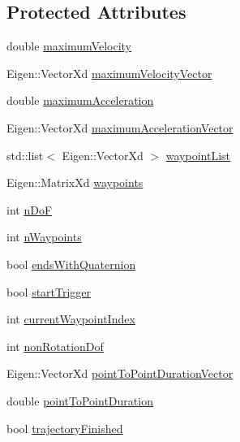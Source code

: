 \subsection*{Protected Attributes}
\begin{DoxyCompactItemize}
\item 
double \hyperlink{classocra_1_1Trajectory_ad79f3742bec59a80c3d641ccdc08012d}{maximum\+Velocity}
\item 
Eigen\+::\+Vector\+Xd \hyperlink{classocra_1_1Trajectory_a206795c8d7e3bcb38b893d69fe0fa336}{maximum\+Velocity\+Vector}
\item 
double \hyperlink{classocra_1_1Trajectory_a9dbb0a7d6ecaeaf98b915193a8c853d7}{maximum\+Acceleration}
\item 
Eigen\+::\+Vector\+Xd \hyperlink{classocra_1_1Trajectory_a86d9d30e890716e117ab2d3b4b328f3d}{maximum\+Acceleration\+Vector}
\item 
std\+::list$<$ Eigen\+::\+Vector\+Xd $>$ \hyperlink{classocra_1_1Trajectory_a37630b26ba23826298167f37534ff6f3}{waypoint\+List}
\item 
Eigen\+::\+Matrix\+Xd \hyperlink{classocra_1_1Trajectory_ab0514f8c3c8d4827b19dc863ff800b43}{waypoints}
\item 
int \hyperlink{classocra_1_1Trajectory_a6c5df48ec92b0a64dc39091bc0c17199}{n\+DoF}
\item 
int \hyperlink{classocra_1_1Trajectory_a233933b988029ac1a6ae24b58e59bf3e}{n\+Waypoints}
\item 
bool \hyperlink{classocra_1_1Trajectory_a4f230978860de9473f83df3b8ae31ad9}{ends\+With\+Quaternion}
\item 
bool \hyperlink{classocra_1_1Trajectory_af07103499262cbe56eba69a713e4f3b3}{start\+Trigger}
\item 
int \hyperlink{classocra_1_1Trajectory_a2eb6b279dca80ba684969374ddea0d8c}{current\+Waypoint\+Index}
\item 
int \hyperlink{classocra_1_1Trajectory_a6ea59dbc9549f00f95a05581dea36415}{non\+Rotation\+Dof}
\item 
Eigen\+::\+Vector\+Xd \hyperlink{classocra_1_1Trajectory_ad00d173bd78dc9ff365736e751fa3ef8}{point\+To\+Point\+Duration\+Vector}
\item 
double \hyperlink{classocra_1_1Trajectory_a7601711560c35d3096ed541708cce691}{point\+To\+Point\+Duration}
\item 
bool \hyperlink{classocra_1_1Trajectory_ae3367f25d52a9b411a86f75a7b7d06ca}{trajectory\+Finished}
\end{DoxyCompactItemize}


